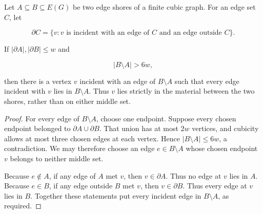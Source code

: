 \begin{lemma}
\label{lem:cubic-sphere-cut-material}
Let \(A\subseteq B\subseteq E(G)\) be two edge shores of a finite cubic
graph.  For an edge set \(C\), let

\[
 \partial C=\{v:\text{\(v\) is incident with an edge of \(C\) and an edge
 outside \(C\)}\}.
\]

If \(|\partial A|,|\partial B|\le w\) and

\[
                         |B\setminus A|>6w,
\]

then there is a vertex \(v\) incident with an edge of \(B\setminus A\)
such that every edge incident with \(v\) lies in \(B\setminus A\).
Thus \(v\) lies strictly in the material between the two shores, rather
than on either middle set.
\end{lemma}

\begin{proof}
For every edge of \(B\setminus A\), choose one endpoint.  Suppose every
chosen endpoint belonged to \(\partial A\cup\partial B\).  That union has
at most \(2w\) vertices, and cubicity allows at most three chosen edges at
each vertex.  Hence \(|B\setminus A|\le6w\), a contradiction.  We may
therefore choose an edge \(e\in B\setminus A\) whose chosen endpoint \(v\)
belongs to neither middle set.

Because \(e\notin A\), if any edge of \(A\) met \(v\), then \(v\in\partial
A\).  Thus no edge at \(v\) lies in \(A\).  Because \(e\in B\), if any edge
outside \(B\) met \(v\), then \(v\in\partial B\).  Thus every edge at \(v\)
lies in \(B\).  Together these statements put every incident edge in
\(B\setminus A\), as required.
\end{proof}

